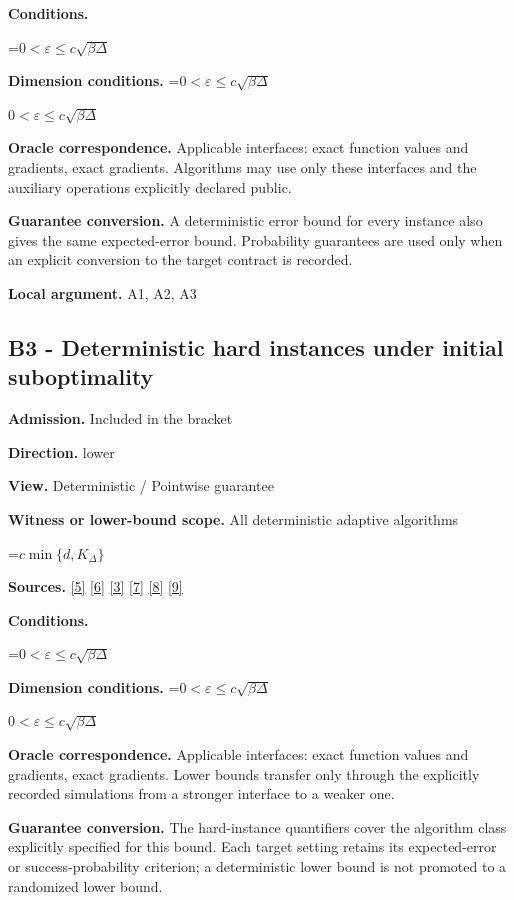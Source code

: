 \documentclass[10pt,a4paper]{article}
\newcommand{\AtlasMath}[1]{\par\begingroup\centering\setbox0=\hbox{$\displaystyle #1$}\ifdim\wd0>1.4\linewidth\typeout{ATLAS WIDE FORMULA: \the\wd0}\fi\ifdim\wd0>\linewidth\resizebox{\linewidth}{!}{\box0}\else\box0\fi\par\endgroup}
\newcommand{\AtlasInlineMath}[1]{\begingroup\setbox0=\hbox{$#1$}\ifdim\wd0>.4\linewidth\endgroup\AtlasMath{#1}\else\endgroup$#1$\fi}
\begin{document}
\textbf{Conditions.} 
\AtlasMath{0<\varepsilon\le c\sqrt{\beta\Delta}}


\textbf{Dimension conditions.} \AtlasInlineMath{0<\varepsilon\le c\sqrt{\beta\Delta}}

\textbf{Oracle correspondence.} Applicable interfaces: exact function values and gradients, exact gradients. Algorithms may use only these interfaces and the auxiliary operations explicitly declared public.

\textbf{Guarantee conversion.} A deterministic error bound for every instance also gives the same expected-error bound. Probability guarantees are used only when an explicit conversion to the target contract is recorded.

\textbf{Local argument.} A1, A2, A3

\subsection{B3 - Deterministic hard instances under initial suboptimality}
\textbf{Admission.} Included in the bracket

\textbf{Direction.} lower

\textbf{View.} Deterministic / Pointwise guarantee

\textbf{Witness or lower-bound scope.} All deterministic adaptive algorithms

\AtlasMath{c\min\{d,K_\Delta\}}
\textbf{Sources.} \href{https://arxiv.org/pdf/2101.09740v2}{[5]} \href{https://arxiv.org/pdf/2609.33360v2}{[6]} \href{https://arxiv.org/pdf/2609.10874}{[3]} \href{https://arxiv.org/pdf/1405.4980}{[7]} \href{https://www2.isye.gatech.edu/~nemirovs/MOR_AccuracyCertificates.pdf}{[8]} \href{https://arxiv.org/pdf/2609.20701}{[9]}

\textbf{Conditions.} 
\AtlasMath{0<\varepsilon\le c\sqrt{\beta\Delta}}


\textbf{Dimension conditions.} \AtlasInlineMath{0<\varepsilon\le c\sqrt{\beta\Delta}}

\textbf{Oracle correspondence.} Applicable interfaces: exact function values and gradients, exact gradients. Lower bounds transfer only through the explicitly recorded simulations from a stronger interface to a weaker one.

\textbf{Guarantee conversion.} The hard-instance quantifiers cover the algorithm class explicitly specified for this bound. Each target setting retains its expected-error or success-probability criterion; a deterministic lower bound is not promoted to a randomized lower bound.
\end{document}
